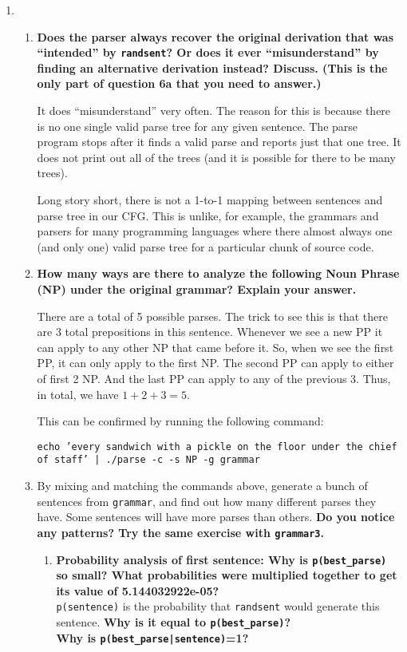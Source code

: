 \documentclass[10pt]{article}
\begin{document}
\begin{enumerate}
\item\begin{enumerate}
 \item {\bf Does the parser
  always recover the original derivation that was ``intended'' by
  \verb|randsent|? Or does it ever ``misunderstand'' by finding an alternative
  derivation instead?  Discuss. (This is the only part of question 6a
  that you need to answer.)}

It does ``misunderstand'' very often. The reason for this is because there is no one single valid parse tree for any given sentence. The parse program stops after it finds a valid parse and reports just that one tree. It does not print out all of the trees (and it is possible for there to be many trees).

Long story short, there is not a 1-to-1 mapping between sentences and parse tree in our CFG. This is unlike, for example, the grammars and parsers for many programming languages where there almost always one (and only one) valid parse tree for a particular chunk of source code.

\item {\bf How many ways are there to analyze the following Noun Phrase (NP)
  under the original grammar?  Explain your answer.}

There are a total of 5 possible parses. The trick to see this is that there are 3 total prepositions in this sentence. Whenever we see a new PP it can apply to any other NP that came before it. So, when we see the first PP, it can only apply to the first NP. The second PP can apply to either of first 2 NP. And the last PP can apply to any of the previous 3. Thus, in total, we have $1 + 2 + 3 = 5$.

This can be confirmed by running the following command:

{\tt echo 'every sandwich with a pickle on the floor under the chief of staff' | ./parse -c -s NP -g grammar}

\item By mixing and matching the commands above, generate a bunch of
  sentences from \verb|grammar|, and find out how many different parses they
  have. Some sentences will have more parses than others. {\bf Do you
  notice any patterns? Try the same exercise with \verb|grammar3|.}

\begin{enumerate} 
\item {\bf Probability analysis of first sentence: Why is \verb|p(best_parse)| so small?  What probabilities were
  multiplied together to get its value of 5.144032922e-05?}\\
\noindent
\verb|p(sentence)| is the probability that \verb|randsent| would
  generate this sentence. {\bf Why is it equal to \verb|p(best_parse)|?}\\
\noindent
{\bf Why is \verb+p(best_parse|sentence)+=1?}


\end{enumerate}
\end{enumerate}
\end{enumerate}
\end{document}
